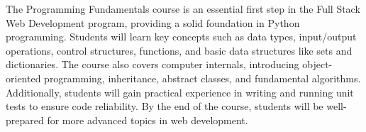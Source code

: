 The Programming Fundamentals course is an essential first step in the Full Stack Web Development program, providing a solid foundation in Python programming.
Students will learn key concepts such as data types, input/output operations, control structures, functions, and basic data structures like sets and dictionaries.
The course also covers computer internals, introducing object-oriented programming, inheritance, abstract classes, and fundamental algorithms.
Additionally, students will gain practical experience in writing and running unit tests to ensure code reliability.
By the end of the course, students will be well-prepared for more advanced topics in web development.
